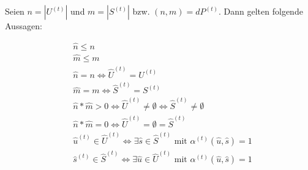 
\begin{Theorem}\label{theoremPools}

Seien $n = |U^{(t)}|$ und $m = |S^{(t)}|$ bzw. $(n, m) = dP^{(t)}$. Dann gelten folgende Aussagen:

\begin{align}
&\widehat{n} \leq n \tag{i.u} \\ 
&\widehat{m} \leq m \tag{i.s} \\
&\widehat{n} = n \Leftrightarrow \widehat{U}^{(t)} = U^{(t)} \tag{ii.u} \\
&\widehat{m} = m \Leftrightarrow \widehat{S}^{(t)} = S^{(t)} \tag{ii.s} \\
&\widehat{n} * \widehat{m} > 0 \Leftrightarrow \widehat{U}^{(t)} \neq \emptyset \Leftrightarrow \widehat{S}^{(t)} \neq \emptyset \tag{iii} \\
&\widehat{n} * \widehat{m} = 0 \Leftrightarrow \widehat{U}^{(t)} = \emptyset = \widehat{S}^{(t)} \tag{iv} \\
&\widehat{u}^{(t)} \in \widehat{U}^{(t)} \Leftrightarrow \exists \widehat{s} \in \widehat{S}^{(t)} \textrm{ mit } \alpha^{(t)}\left(\widehat{u}, \widehat{s}\right) = 1 \tag{v} \\
&\widehat{s}^{(t)} \in \widehat{S}^{(t)} \Leftrightarrow \exists \widehat{u} \in \widehat{U}^{(t)} \textrm{ mit } \alpha^{(t)}\left(\widehat{u}, \widehat{s}\right) = 1 \tag{vi} \label{theoremPools_6}
\end{align}

\end{Theorem}

\vspace{0.3cm}

